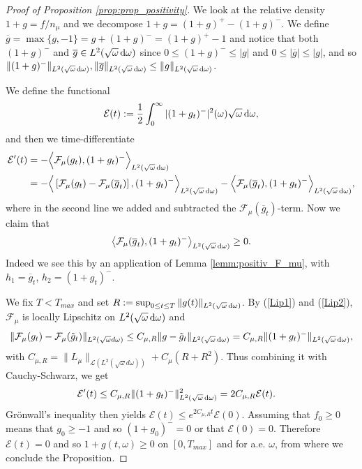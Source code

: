 \documentclass[reqno,11pt,letterpaper]{amsart}
\numberwithin{equation}{section}
\newcommand{\dd}{\, {\rm d}}
\begin{document}
\begin{proof}[Proof of Proposition \ref{prop:prop_positivity}]
We look at the relative density $1+g = f/n_\mu$ and we decompose $1+g = (1+g)^+ - (1+g)^-$. We define $\overline{g}=\max\{g,-1\} = g + (1+g)^- = (1+g)^+-1$ and  notice that both $(1+g)^-$ and $\overline{g} \in L^2(\sqrt{\omega}\dd \omega)$ since $0\leq (1+g)^- \leq |g|$ and $0\leq |\overline{g}| \leq |g|$, and so  $\|(1+g)^-\|_{L^2(\sqrt{\omega}\dd \omega  )}, \|\overline{g}\|_{L^2(\sqrt{\omega}\dd \omega)} \leq \|g\|_{L^2(\sqrt{\omega}\dd \omega)}$.

We define the functional $$\mathcal{E}(t):= \frac{1}{2} \int_0^\infty | (1+g_t)^-|^2(\omega)\sqrt{\omega}\dd\omega,$$
and then we time-differentiate 
\begin{align*}
   \mathcal{E}'(t)& = -\Big\langle  \mathcal{F}_\mu(g_t), (1+g_t)^-\Big\rangle_{L^2(\sqrt{\omega}\dd\omega)}  \\
   & = -\Big\langle \left[ \mathcal{F}_\mu(g_t) - \mathcal{F}_\mu(\overline{g}_t)\right] , (1+g_t)^- \Big\rangle_{L^2(\sqrt{\omega}\dd \omega)} - 
   \Big\langle \mathcal{F}_\mu(\overline{g}_t) , (1+g_t)^-\Big\rangle_{L^2(\sqrt{\omega}\dd \omega)},
\end{align*}
where in the second line we added and subtracted the $\mathcal{F}_\mu(\overline{g}_t)$-term. Now we claim that 
\begin{align} \label{eq:claim1_positiv}
\big\langle \mathcal{F}_\mu(\overline{g}_t) , (1+g_t)^-\big\rangle_{L^2(\sqrt{\omega}\dd \omega)}\geq 0.
\end{align}
Indeed we see this by an application of Lemma \ref{lemm:positiv_F_mu}, with
$h_1=\overline{g}_t$, $h_2 = (1+g_t)^- $.
 
 We fix $T <T_{max}$ and set $ R:=\sup_{0\leq t\leq T }\|g(t)\|_{L^2(\sqrt{\omega}\dd \omega)}$. By (\ref{Lip1}) and (\ref{Lip2}),  $\mathcal{F}_\mu$ is locally Lipschitz on $L^2(\sqrt{\omega}\dd \omega )$ and
\begin{align*}
     \|\mathcal{F}_\mu(g_t)-\mathcal{F}_\mu(\tilde{g}_t)\|_{L^2(\sqrt{\omega}d\omega )}\leq
    C_{\mu,R}\|g-\tilde{g}_t\|_{L^2(\sqrt{\omega}\dd \omega )}
=C_{\mu,R}\|(1+g_t)^-\|_{L^2(\sqrt{\omega}\dd \omega )}, 
\end{align*}
with $C_{\mu,R} = \|L_\mu\|_{\mathcal{L}(L^2(\sqrt{\omega}d\omega ))} + C_\mu (R+R^2)$. 
Thus combining it with Cauchy-Schwarz, we get 
\begin{align*}
    \mathcal{E}'(t)& \leq C_{\mu, R}\|(1+g_t)^-\|_{L^2(\sqrt{\omega}\dd \omega)}^2 =  2 C_{\mu,R} \mathcal{E}(t).  
\end{align*}
   Gr\"{o}nwall's inequality then yields $\mathcal{E}(t)\leq e^{2 C_{\mu,R} t} \mathcal{E}(0)$. Assuming that $f_0\geq 0$ means that $g_0 \geq -1$ and so $(1+g_0)^-=0$ or that $\mathcal{E}(0)=0$. Therefore $\mathcal{E}(t)=0$ and so $1+g(t,\omega)\geq 0$ on $[0,T_{max}]$ and for a.e. $\omega$, from where we conclude the Proposition.


\end{proof}
\end{document}
